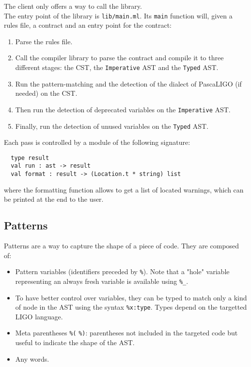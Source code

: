 \documentclass[10pt,a4paper]{article}
\begin{document}
The client only offers a way to call the library.\\
The entry point of the library is \verb|lib/main.ml|. Its \verb|main| function will, given a rules file, a contract and an entry point for the contract:
\begin{enumerate}
\item Parse the rules file.
\item Call the compiler library to parse the contract and compile it to three different stages: the CST, the \verb|Imperative| AST and the \verb|Typed| AST.
\item Run the pattern-matching and the detection of the dialect of PascaLIGO (if needed) on the CST.
\item Then run the detection of deprecated variables on the \verb|Imperative| AST.
\item Finally, run the detection of unused variables on the \verb|Typed| AST.
\end{enumerate}

Each pass is controlled by a module of the following signature:
\begin{verbatim}
  type result
  val run : ast -> result
  val format : result -> (Location.t * string) list
\end{verbatim}

where the formatting function allows to get a list of located warnings, which can be printed at the end to the user.

\subsection{Patterns}
Patterns are a way to capture the shape of a piece of code. They are composed of:

\begin{itemize}
\item Pattern variables (identifiers preceded by \verb|%|). Note that a "hole" variable representing an always fresh variable is available using \verb|%_|.
\item To have better control over variables, they can be typed to match only a kind of node in the AST using the syntax \verb|%x:type|. Types depend on the targetted LIGO language.
\item Meta parentheses \verb|%(| \verb|%)|: parentheses not included in the targeted code but useful to indicate the shape of the AST.
\item Any words.
\end{itemize}
\end{document}
